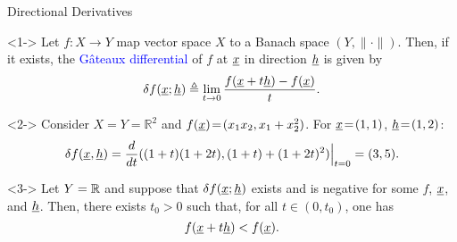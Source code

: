 \documentclass[10pt,letterpaper,english]{beamer}
\begin{document}
\begin{frame}{Directional Derivatives}

\begin{definition}<1->
Let $f \colon X \rightarrow Y$ map vector space $X$ to a Banach space $(Y,\|\cdot\|)$.
Then, if it exists, the \textcolor{blue}{G\^{a}teaux differential} of $f$ at  $\underline{x}$ in direction $\underline{h}$ is given by \vspace{-1.5mm}
\[ \delta f (\underline{x};\underline{h}) \triangleq \lim_{t \to 0} \frac{f(\underline{x}+t \underline{h}) - f(\underline{x})}{t}. \]
\end{definition}

\begin{example}<2->
Consider $X\!=\!Y\!=\!\mathbb{R}^2$ and $f(\underline{x})\! =\! (x_1 x_2,x_1+x_2^2)$.
For $\underline{x}\!=\!(1,1)$, $\underline{h}\!=\!(1,2)$: \vspace{-2.5mm}
\[ \delta f ( \underline{x},\underline{h} ) = \frac{d}{dt} ((1+t)(1+2t),(1+t)+(1+2t)^2) \Big|_{t=0} = (3,5). \]
\end{example}

\begin{lemma}<3->
Let $Y=\mathbb{R}$ and suppose that $\delta f (\underline{x};\underline{h})$ exists and is negative for some $f$, $\underline{x}$, and $\underline{h}$.  Then, there exists $t_0 > 0$ such that, for all $t\in(0,t_0)$, one has \vspace{-2mm}
\[ f(\underline{x}+t \underline{h}) < f (\underline{x}). \]
\end{lemma}


\end{frame}
\end{document}
